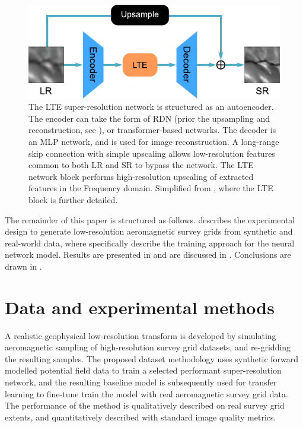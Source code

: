 \begin{figure}[hbtp]
    \includegraphics[width=\linewidth]{fig/p2/ltenet.pdf}
    \caption[The LTE architecture]{
        The LTE super-resolution network is structured as an autoencoder.
        The encoder can take the form of RDN (prior the upsampling and reconstruction, see ), or transformer-based networks.
        The decoder is an MLP network, and is used for image reconstruction.
        A long-range skip connection with simple upscaling allows low-resolution features common to both LR and SR to bypass the network.
        The LTE network block performs high-resolution upscaling of extracted features in the Frequency domain.
        Simplified from \textcite{leeLocalTextureEstimator2022}, where the LTE block is further detailed.
    }
    \label{fig:ltenet}
\end{figure}

The remainder of this paper is structured as follows.
 describes the experimental design to generate low-resolution aeromagnetic survey grids from synthetic and real-world data, where  specifically describe the training approach for the neural network model.
Results are presented in  and are discussed in .
Conclusions are drawn in .

\section{Data and experimental methods}
\label{sec:2methods}
A realistic geophysical low-resolution transform is developed by simulating aeromagnetic sampling of high-resolution survey grid datasets, and re-gridding the resulting samples.
The proposed dataset methodology uses synthetic forward modelled potential field data to train a selected performant super-resolution network, and the resulting baseline model is subsequently used for transfer learning to fine-tune train the model with real aeromagnetic survey grid data.
The performance of the method is qualitatively described on real survey grid extents, and quantitatively described with standard image quality metrics.

